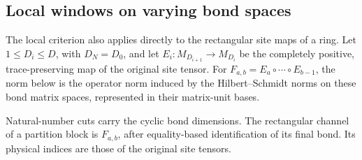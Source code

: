 \subsection{Local windows on varying bond spaces}

The local criterion also applies directly to the rectangular site maps of a ring.
Let $1\le D_i\le D$, with $D_N=D_0$, and let
$E_i:M_{D_{i+1}}\to M_{D_i}$ be the completely positive, trace-preserving
map of the original site tensor. For $F_{a,b}=E_a\circ\cdots\circ E_{b-1}$,
the norm below is the operator norm induced by the Hilbert--Schmidt norms
on these bond matrix spaces, represented in their matrix-unit bases.

\begin{definition}
    \label{def:ldp_rectangular_cut_channels}
    \leanok
    Natural-number cuts carry the cyclic bond dimensions. The rectangular
    channel of a partition block is $F_{a,b}$, after equality-based identification
    of its final bond. Its physical indices are those of the original site tensors.
\end{definition}

